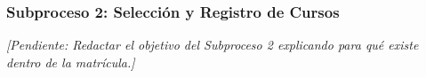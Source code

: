 \subsubsection{Subproceso 2: Selección y Registro de Cursos}

\textit{[Pendiente: Redactar el objetivo del Subproceso 2 explicando para qué existe dentro de la matrícula.]}

